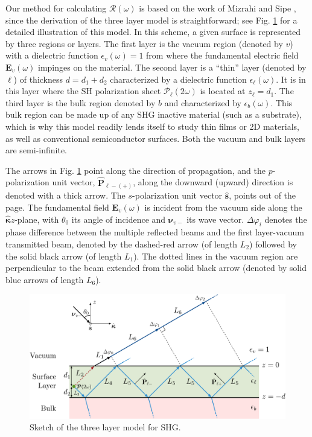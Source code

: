 \documentclass[aps,pra,10pt,amsmath,twocolumn,letterpaper]{revtex4-1}
\begin{document}
Our method for calculating $\mathcal{R}(\omega)$ is based on the work of Mizrahi
and Sipe \cite{mizrahiJOSA88}, since the derivation of the three layer model is
straightforward; see Fig. \ref{fig:MR3layer2w} for a detailed illustration of
this model. In this scheme, a given surface is represented by three regions or
layers. The first layer is the vacuum region (denoted by $v$) with a dielectric
function $\epsilon_{v}(\omega)=1$ from where the fundamental electric field
$\mathbf{E}_{v}(\omega)$ impinges on the material. The second layer is a
``thin'' layer (denoted by $\ell$) of thickness $d = d_{1} + d_{2}$
characterized by a dielectric function $\epsilon_{\ell}(\omega)$. It is in this
layer where the SH polarization sheet $\boldsymbol{\mathcal{P}}_{\ell}(2\omega)$
is located at $z_{\ell} = d_{1}$. The third layer is the bulk region denoted by
$b$ and characterized by $\epsilon_{b}(\omega)$. This bulk region can be made up
of any SHG inactive material (such as a substrate), which is why this model
readily lends itself to study thin films or 2D materials, as well as
conventional semiconductor surfaces. Both the vacuum and bulk layers are
semi-infinite.

The arrows in Fig. \ref{fig:MR3layer2w} point along the direction of
propagation, and the $p$-polarization unit vector, $\hat{\mathbf{P}}_{\ell
-(+)}$, along the downward (upward) direction is denoted with a thick arrow. The
$s$-polarization unit vector $\hat{\mathbf{s}}$, points out of the page. The
fundamental field $\mathbf{E}_{v}(\omega)$ is incident from the vacuum side
along the $\hat{\boldsymbol{\kappa}}z$-plane, with $\theta_{0}$ its angle of
incidence and $\boldsymbol{\nu}_{v-}$ its wave vector. $\Delta\varphi_{i}$
denotes the phase difference between the multiple reflected beams and the first
layer-vacuum transmitted beam, denoted by the dashed-red arrow (of length
$L_{2}$) followed by the solid black arrow (of length $L_{1}$). The dotted lines
in the vacuum region are perpendicular to the beam extended from the solid black
arrow (denoted by solid blue arrows of length $L_{6}$).

\begin{figure}[b]
\centering 
\includegraphics[width=\linewidth]{../content/figures/diag-3layer_MR_2w}
\caption{Sketch of the three layer model for SHG.}
\label{fig:MR3layer2w}
\end{figure}
\end{document}
